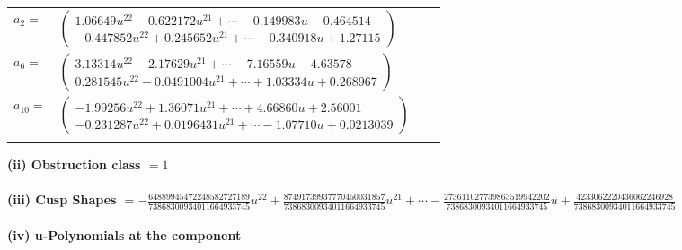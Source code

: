 \documentclass[1p]{elsarticle_modified}
\theoremstyle{definition}
\begin{document}
\begin{tabular}{m{7pt} m{180pt} m{7pt} m{180pt} }
\flushright $a_{2}=$&$\begin{pmatrix}1.06649 u^{22}-0.622172 u^{21}+\cdots-0.149983 u-0.464514\\-0.447852 u^{22}+0.245652 u^{21}+\cdots-0.340918 u+1.27115\end{pmatrix}$ \\
\flushright $a_{6}=$&$\begin{pmatrix}3.13314 u^{22}-2.17629 u^{21}+\cdots-7.16559 u-4.63578\\0.281545 u^{22}-0.0491004 u^{21}+\cdots+1.03334 u+0.268967\end{pmatrix}$ \\
\flushright $a_{10}=$&$\begin{pmatrix}-1.99256 u^{22}+1.36071 u^{21}+\cdots+4.66860 u+2.56001\\-0.231287 u^{22}+0.0196431 u^{21}+\cdots-1.07710 u+0.0213039\end{pmatrix}$\\&\end{tabular}
\flushleft \textbf{(ii) Obstruction class $= 1$}\\~\\
\flushleft \textbf{(iii) Cusp Shapes $= -\frac{64889945472248582727189}{73868300934011664933745} u^{22}+\frac{87491739937770450031857}{73868300934011664933745} u^{21}+\cdots-\frac{273611027739863519942202}{73868300934011664933745} u+\frac{4233062220436062246928}{73868300934011664933745}$}\\~\\
\newpage\renewcommand{\arraystretch}{1}
\flushleft \textbf{(iv) u-Polynomials at the component}\newline \\
\end{document}
